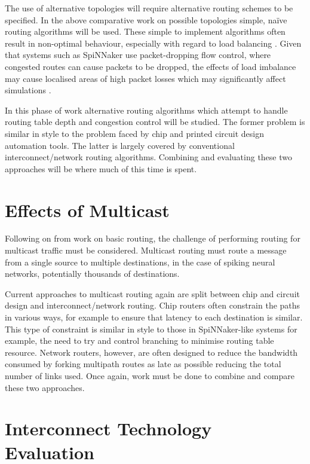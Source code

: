 		The use of alternative topologies will require alternative routing schemes
		to be specified. In the above comparative work on possible topologies
		simple, na\"ive routing algorithms will be used. These simple to implement
		algorithms often result in non-optimal behaviour, especially with regard to
		load balancing \cite{dally04}. Given that systems such as SpiNNaker use
		packet-dropping flow control, where congested routes can cause packets to be
		dropped, the effects of load imbalance may cause localised areas of high
		packet losses which may significantly affect simulations
		\cite{greenfield10}.
		
		In this phase of work alternative routing algorithms which attempt to handle
		routing table depth and congestion control will be studied. The former
		problem is similar in style to the problem faced by chip and printed circuit
		design automation tools. The latter is largely covered by conventional
		interconnect/network routing algorithms. Combining and evaluating these two
		approaches will be where much of this time is spent.
	
	\section{Effects of Multicast}
		
		Following on from work on basic routing, the challenge of performing routing
		for multicast traffic must be considered. Multicast routing must route a
		message from a single source to multiple destinations, in the case of
		spiking neural networks, potentially thousands of destinations.
		
		Current approaches to multicast routing again are split between chip and
		circuit design and interconnect/network routing. Chip routers often
		constrain the paths in various ways, for example to ensure that latency to
		each destination is similar. This type of constraint is similar in style to
		those in SpiNNaker-like systems for example, the need to try and control
		branching to minimise routing table resource. Network routers, however, are
		often designed to reduce the bandwidth consumed by forking multipath routes
		as late as possible reducing the total number of links used. Once again,
		work must be done to combine and compare these two approaches.
	
	\section{Interconnect Technology Evaluation}
		

